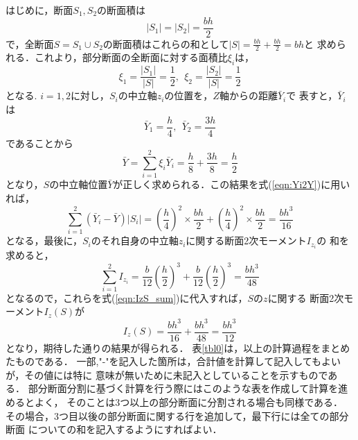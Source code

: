 \documentclass[10pt,a4j]{jarticle}
\begin{document}
はじめに，断面$S_1,S_2$の断面積は
\begin{equation}
	\left| S_1 \right|
	=
	\left| S_2 \right|
	=
	\frac{bh}{2}
	\label{eqn:area_S1S2}
\end{equation}
で，全断面$S=S_1\cup S_2$の断面積はこれらの和として$\left|S\right|=\frac{bh}{2}+\frac{bh}{2}=bh$と
求められる．これより，部分断面の全断面に対する面積比$\xi_i$は，
\begin{equation}
	\xi_1=\frac{\left| S_1 \right|}{\left|S\right|} =\frac{1}{2}
	, \ \ 
	\xi_2=\frac{\left| S_2 \right|}{\left|S\right|} =\frac{1}{2}
	\label{eqn:ratio_area}
\end{equation}
となる. $i=1,2$に対し，$S_i$の中立軸$z_i$の位置を，$Z$軸からの距離$\bar{Y}_i$で
表すと，$\bar{Y}_i$は
\begin{equation}
	\bar{Y}_1=\frac{h}{4}
	, \  \
	\bar{Y}_2=\frac{3h}{4}
	\label{eqn:}
\end{equation}
であることから
\begin{equation}
	\bar{Y}=\sum_{i=1}^2 \xi_i \bar{Y}_i
	=\frac{h}{8}+\frac{3h}{8}=\frac{h}{2}
	\label{eqn:}
\end{equation}
となり，$S$の中立軸位置$\bar Y$が正しく求められる．この結果を式(\ref{eqn:Yi2Y})に用いれば，
\begin{equation}
	\sum_{i=1}^2 \left( \bar{Y}_i-\bar{Y}\right) \left| S_i\right|
	=
	\left(\frac{h}{4}\right)^2\times \frac{bh}{2}
	+
	\left(\frac{h}{4}\right)^2\times \frac{bh}{2}
	=\frac{bh^3}{16}
\end{equation}
となる，最後に，$S_i$のそれ自身の中立軸$z_i$に関する断面2次モーメント$I_{z_i}$の
和を求めると，
\begin{equation}
	\sum_{i=1}^2 I_{z_i}=
	\frac{b}{12}\left(\frac{h}{2}\right)^3
	+
	\frac{b}{12}\left(\frac{h}{2}\right)^3
	=
	\frac{bh^3}{48}
\end{equation}
となるので，これらを式(\ref{eqn:IzS_sum})に代入すれば，$S$の$z$に関する
断面2次モーメント$I_z(S)$が
\begin{equation}
	I_z(S)=
	\frac{bh^3}{16}
	+
	\frac{bh^3}{48}
	=
	\frac{bh^3}{12}
\end{equation}
となり，期待した通りの結果が得られる．
表\ref{tbl0}は，以上の計算過程をまとめたものである．
一部,"-"を記入した箇所は，合計値を計算して記入してもよいが，その値には特に
意味が無いために未記入としていることを示すものである．
部分断面分割に基づく計算を行う際にはこのような表を作成して計算を進めるとよく，
そのことは3つ以上の部分断面に分割される場合も同様である．
その場合，3つ目以後の部分断面に関する行を追加して，最下行には全ての部分断面
についての和を記入するようにすればよい．
\end{document}
